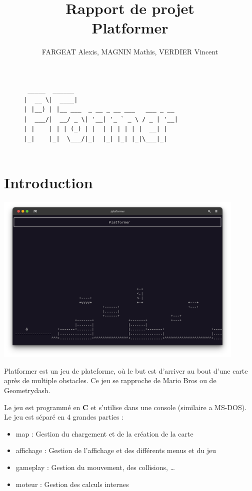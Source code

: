\documentclass[12pt]{article}
\title{Rapport de projet\\ Platformer}
\author{\small FARGEAT Alexis, MAGNIN Mathis, VERDIER Vincent}
\begin{document}
	\maketitle

	\begin{figure}[H]
		\centering
		\begin{BVerbatim}
 _____  ______                               
|  __ \|  ____|                             
| |__) | |__ ___  _ __ _ __ ___   ___ _ __   
|  ___/|  __/ _ \| '__| '_ ` _ \ / _ | '__|
| |    | | | (_) | |  | | | | | |  __| |     
|_|    |_|  \___/|_|  |_| |_| |_|\___|_|   


		\end{BVerbatim}
	\end{figure}

	\tableofcontents
	\newpage

	\section{Introduction}
	
		\begin{center}
			\includegraphics[width=0.90\textwidth]{content/image.png}
		\end{center}
	
		Platformer est un jeu de plateforme, où le but est d'arriver au bout d'une carte après de multiple obstacles.
		Ce jeu se rapproche de Mario Bros ou de Geometrydash.
	
		Le jeu est programmé en \textbf{C} et s'utilise dans une console (similaire a MS-DOS).\\

		Le jeu est séparé en 4 grandes parties :
		\begin{itemize}
			\item map : Gestion du chargement et de la création de la carte
			\item affichage : Gestion de l'affichage et des différents menus et du jeu
			\item gameplay : Gestion du mouvement, des collisions, \dots
			\item moteur : Gestion des calculs internes\\
		\end{itemize}
	
\end{document}
